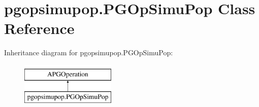 \hypertarget{classpgopsimupop_1_1PGOpSimuPop}{}\section{pgopsimupop.\+P\+G\+Op\+Simu\+Pop Class Reference}
\label{classpgopsimupop_1_1PGOpSimuPop}
Inheritance diagram for pgopsimupop.\+P\+G\+Op\+Simu\+Pop\+:\begin{figure}[H]
\begin{center}
\leavevmode
\includegraphics[height=2.000000cm]{classpgopsimupop_1_1PGOpSimuPop}
\end{center}
\end{figure}
